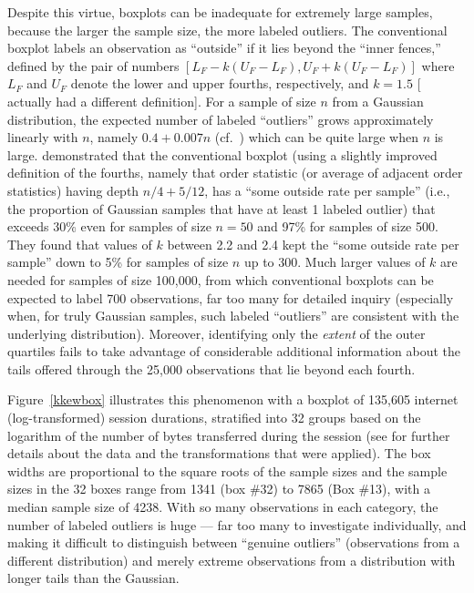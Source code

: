 \documentclass[oneside]{article}
\begin{document}
Despite this virtue, boxplots can be inadequate for extremely large samples,
because the larger the sample size, the more labeled outliers. The
conventional boxplot \citep{eda, emerson83} labels an observation as
``outside'' if it lies beyond the ``inner fences,'' defined by the pair of
numbers $[L_F - k(U_F - L_F), U_F + k(U_F - L_F)]$ where $L_F$ and $U_F$
denote the lower and upper fourths, respectively, and $k = 1.5$ [\citet{eda}
actually had a different definition]. For a sample of size $n$ from a Gaussian
distribution, the expected number of labeled ``outliers'' grows approximately
linearly with $n$, namely $0.4 + 0.007n$ (cf.~\citet{dchlv}) which can be
quite large when $n$ is large. \citet[pg. 1148]{dchbox} demonstrated that the
conventional boxplot (using a slightly improved definition of the fourths,
namely that order statistic (or average of adjacent order statistics) having
depth $n/4 + 5/12$, has a ``some outside rate per sample'' (i.e., the
proportion of Gaussian samples that have at least 1 labeled outlier) that
exceeds 30\% even for samples of size $n = 50$ and 97\% for samples of size
500. They found that values of $k$ between 2.2 and 2.4 kept the ``some outside
rate per sample'' down to 5\% for samples of size $n$ up to 300. Much larger
values of $k$ are needed for samples of size 100,000, from which conventional
boxplots can be expected to label 700 observations, far too many for detailed
inquiry (especially when, for truly Gaussian samples, such labeled
``outliers'' are consistent with the underlying distribution). Moreover,
identifying only the \textit{extent} of the outer quartiles fails to take
advantage of considerable additional information about the tails offered
through the 25,000 observations that lie beyond each fourth.

Figure~\ref{kkewbox} illustrates this phenomenon with a boxplot of 135,605
internet (log-transformed) session durations, stratified into 32 groups based
on the logarithm of the number of bytes transferred during the session (see
\citet{kw06} for further details about the data and the transformations that
were applied). The box widths are proportional to the square roots of the
sample sizes \citep{variations.boxplots} and the sample sizes in the 32 boxes
range from 1341 (box \#32) to 7865 (Box \#13), with a median sample size of
4238. With so many observations in each category, the number of labeled
outliers is huge --- far too many to investigate individually, and making it
difficult to distinguish between ``genuine outliers'' (observations from a
different distribution) and merely extreme observations from a distribution
with longer tails than the Gaussian. 
\end{document}
